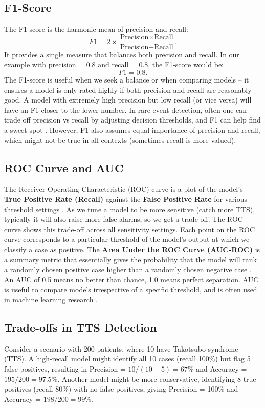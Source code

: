 \documentclass[12pt, BSc]{muthesis}
\begin{document}
\subsection{F1-Score}
The F1-score is the harmonic mean of precision and recall:
\[
F1 = 2 \times \frac{\text{Precision} \times \text{Recall}}{\text{Precision} + \text{Recall}}.
\]
It provides a single measure that balances both precision and recall. In our example with precision = 0.8 and recall = 0.8, the F1-score would be:
\[
F1 = 0.8.
\]
The F1-score is useful when we seek a balance or when comparing models – it ensures a model is only rated highly if both precision and recall are reasonably good. A model with extremely high precision but low recall (or vice versa) will have an F1 closer to the lower number. In rare event detection, often one can trade off precision vs recall by adjusting decision thresholds, and F1 can help find a sweet spot \cite{Sokolova2009}. However, F1 also assumes equal importance of precision and recall, which might not be true in all contexts (sometimes recall is more valued).

\subsection{ROC Curve and AUC}
The Receiver Operating Characteristic (ROC) curve is a plot of the model’s \textbf{True Positive Rate (Recall)} against the \textbf{False Positive Rate} for various threshold settings \cite{Fawcett2006}. As we tune a model to be more sensitive (catch more TTS), typically it will also raise more false alarms, so we get a trade-off. The ROC curve shows this trade-off across all sensitivity settings. Each point on the ROC curve corresponds to a particular threshold of the model’s output at which we classify a case as positive. The \textbf{Area Under the ROC Curve (AUC-ROC)} is a summary metric that essentially gives the probability that the model will rank a randomly chosen positive case higher than a randomly chosen negative case \cite{Bradley1997}. An AUC of 0.5 means no better than chance, 1.0 means perfect separation. AUC is useful to compare models irrespective of a specific threshold, and is often used in machine learning research \cite{Saito2015}.

\subsection{Trade-offs in TTS Detection}
Consider a scenario with 200 patients, where 10 have Takotsubo syndrome (TTS). A high-recall model might identify all 10 cases (recall 100\%) but flag 5 false positives, resulting in Precision = $10/(10+5) = 67\%$ and Accuracy = $195/200 = 97.5\%$. Another model might be more conservative, identifying 8 true positives (recall 80\%) with no false positives, giving Precision = 100\% and Accuracy = $198/200 = 99\%$. 
\end{document}
